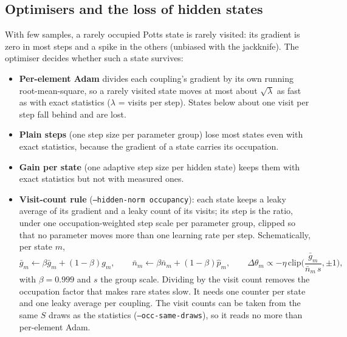 \documentclass[11pt,a4paper]{article}
\begin{document}
\subsection{Optimisers and the loss of hidden states}
With few samples, a rarely occupied Potts state is rarely visited: its gradient is zero in most steps and a spike
in the others (unbiased with the jackknife). The optimiser decides whether such a state survives:
\begin{itemize}
\item \textbf{Per-element Adam} divides each coupling's gradient by its own running root-mean-square, so a rarely
  visited state moves at most about $\sqrt\lambda$ as fast as with exact statistics ($\lambda$ = visits per step).
  States below about one visit per step fall behind and are lost.
\item \textbf{Plain steps} (one step size per parameter group) lose most states even with exact statistics,
  because the gradient of a state carries its occupation.
\item \textbf{Gain per state} (one adaptive step size per hidden state) keeps them with exact statistics but not
  with measured ones.
\item \textbf{Visit-count rule} (\texttt{--hidden-norm occupancy}): each state keeps a leaky average of its gradient
  and a leaky count of its visits; its step is the ratio, under one occupation-weighted step scale per parameter
  group, clipped so that no parameter moves more than one learning rate per step. Schematically, per state $m$,
  \begin{equation}
    \bar g_m\leftarrow\beta\bar g_m+(1-\beta)g_m,\qquad \bar n_m\leftarrow\beta\bar n_m+(1-\beta)\hat p_m,\qquad
    \Delta\theta_m\propto-\eta\,\mathrm{clip}\Big(\frac{\bar g_m}{\bar n_m\,s},\pm1\Big),
  \end{equation}
  with $\beta=0.999$ and $s$ the group scale. Dividing by the visit count removes the occupation factor that makes
  rare states slow. It needs one counter per state and one leaky average per coupling. The visit counts can be
  taken from the same $S$ draws as the statistics (\texttt{--occ-same-draws}), so it reads no more than per-element
  Adam.
\end{itemize}

\end{document}
